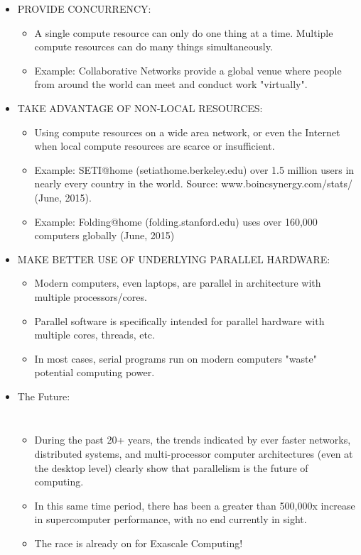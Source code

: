 \documentclass[10pt,t]{beamer}
\begin{document}
\begin{frame}[allowframebreaks,c]
\begin{itemize}
\item PROVIDE CONCURRENCY:
\begin{itemize}
\item A single compute resource can only do one thing at a time. Multiple compute resources can do many things simultaneously.
\item Example: Collaborative Networks provide a global venue where people from around the world can meet and conduct work "virtually".
\end{itemize}
\framebreak
\item TAKE ADVANTAGE OF NON-LOCAL RESOURCES:
\begin{itemize}
\item Using compute resources on a wide area network, or even the Internet when local compute resources are scarce or insufficient.
\item Example: SETI@home (setiathome.berkeley.edu) over 1.5 million users in nearly every country in the world. Source: www.boincsynergy.com/stats/ (June, 2015).
\item Example: Folding@home (folding.stanford.edu) uses over 160,000 computers globally (June, 2015)
\end{itemize}
\item MAKE BETTER USE OF UNDERLYING PARALLEL HARDWARE:
\begin{itemize}
\item Modern computers, even laptops, are parallel in architecture with multiple processors/cores.
\item Parallel software is specifically intended for parallel hardware with multiple cores, threads, etc.
\item In most cases, serial programs run on modern computers "waste" potential computing power.
\end{itemize}
\framebreak
\item The Future:
\begin{columns}[c]
\begin{itemize}
\item During the past 20+ years, the trends indicated by ever faster networks, distributed systems, and multi-processor computer architectures (even at the desktop level) clearly show that parallelism is the future of computing.
\item In this same time period, there has been a greater than 500,000x increase in supercomputer performance, with no end currently in sight.
\item The race is already on for Exascale Computing!

\end{itemize}
\end{columns}
\end{itemize}
\end{frame}
\end{document}
